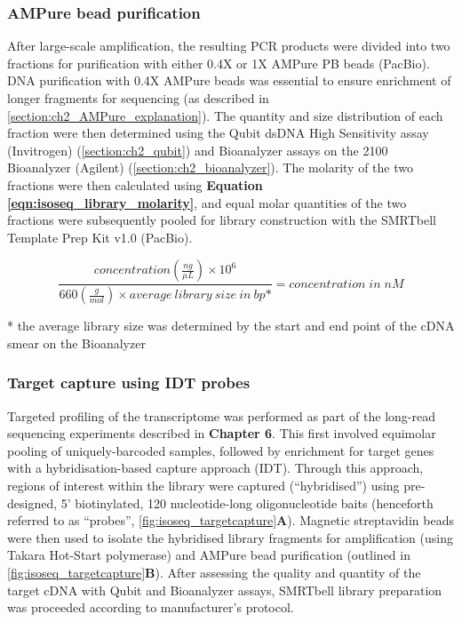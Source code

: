 \subsubsection{AMPure bead purification} 
\label{section:ch2_ampurebead_pool} 
After large-scale amplification, the resulting PCR products were divided into two fractions for purification with either 0.4X or 1X AMPure PB beads (PacBio). DNA purification with 0.4X AMPure beads was essential to ensure enrichment of longer fragments for sequencing (as described in \cref{section:ch2_AMPure_explanation}). The quantity and size distribution of each fraction were then determined using the Qubit dsDNA High Sensitivity assay (Invitrogen) (\cref{section:ch2_qubit}) and Bioanalyzer assays on the 2100 Bioanalyzer (Agilent) (\cref{section:ch2_bioanalyzer}). The molarity of the two fractions were then calculated using \textbf{Equation \ref{eqn:isoseq_library_molarity}}, and equal molar quantities of the two fractions were subsequently pooled for library construction with the SMRTbell Template Prep Kit v1.0 (PacBio). 

\begin{equation}
	\label{eqn:isoseq_library_molarity}
	\frac{concentration(\frac{ng}{\mu L})\times 10^6}{660(\frac{g}{mol}) \times average\:library\:size\:in\:bp\mbox{*}} = concentration\;in\; nM
\end{equation}
\begin{adjustwidth}{1.8em}{1.8em}
* the average library size was determined by the start and end point of the cDNA smear on the Bioanalyzer
\end{adjustwidth}

\subsubsection{Target capture using IDT probes} 
\label{section:ch2_targetcapture_explanation} 
Targeted profiling of the transcriptome was performed as part of the long-read sequencing experiments described in \textbf{Chapter 6}. This first involved equimolar pooling of uniquely-barcoded samples, followed by enrichment for target genes with a hybridisation-based capture approach (IDT). Through this approach, regions of interest within the library were captured (“hybridised”) using pre-designed, 5’ biotinylated, 120 nucleotide-long oligonucleotide baits (henceforth referred to as “probes”, \cref{fig:isoseq_targetcapture}\textbf{A}). Magnetic streptavidin beads were then used to isolate the hybridised library fragments for amplification (using Takara Hot-Start polymerase) and AMPure bead purification (outlined in \cref{fig:isoseq_targetcapture}\textbf{B}). After assessing the quality and quantity of the target cDNA with Qubit and Bioanalyzer assays, SMRTbell library preparation was proceeded according to manufacturer's protocol.  

